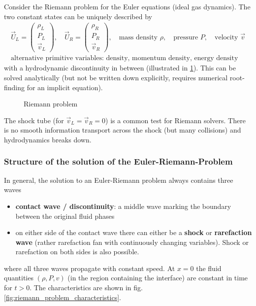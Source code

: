 
Consider the \textcolor{blue1}{Riemann problem for the Euler equations} (ideal gas dynamics).
The two constant states can be uniquely described by
\begin{equation}
    \begin{gathered}
        \vec{U}_L = \begin{pmatrix} \rho_L \\ P_L \\ \vec{v}_L \end{pmatrix}, \quad \vec{U}_R = \begin{pmatrix} \rho_R \\ P_R \\ \vec{v}_R \end{pmatrix}, \quad \text{mass density } \rho, \quad \text{pressure } P, \quad \text{velocity } \vec{v} \\
        \text{alternative primitive variables: density, momentum density, energy density}
    \end{gathered}  
\end{equation}
with a hydrodynamic discontinuity in between (illustrated in \ref{fig:riemann_problem}). This can be solved analytically (but not be written down explicitly, requires numerical root-finding for an implicit equation).

\begin{figure}[htb!]
    \centering
    
    \caption{Riemann problem}
    \label{fig:riemann_problem}
\end{figure}

The shock tube (for $\vec{v}_L = \vec{v}_R = 0$) is a common test for Riemann solvers. There is no smooth
information transport across the shock (but many collisions) and hydrodynamics breaks down.

\subsubsection{Structure of the solution of the Euler-Riemann-Problem}
In general, the solution to an Euler-Riemann problem always contains three waves
\begin{itemize}
    \item \textbf{contact wave / discontinuity}: a middle wave marking the boundary between the original fluid phases
    \item on either side of the contact wave there can either be a \textbf{shock} or \textbf{rarefaction wave} (rather rarefaction fan with continuously changing variables). Shock or rarefaction on both sides is also possible.
\end{itemize}
where all three waves propagate with constant speed. At \textcolor{blue1}{$x=0$ the fluid quantities} $(\rho,P,v)$ (in the region containing the interface) \textcolor{blue1}{are constant in time} for $t>0$.
The characteristics are shown in fig. \ref{fig:riemann_problem_characteristics}.

